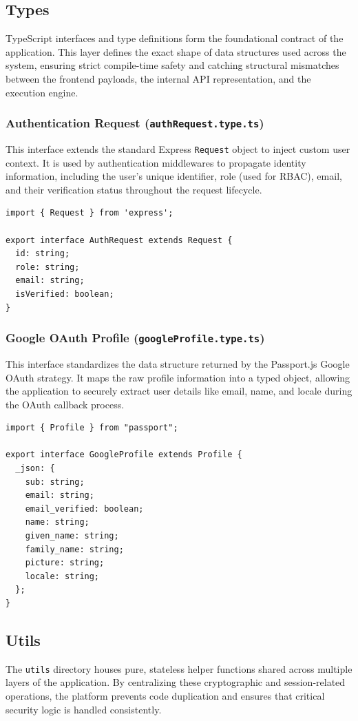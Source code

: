\subsection{Types}
TypeScript interfaces and type definitions form the foundational contract of the application. This layer defines the exact shape of data structures used across the system, ensuring strict compile-time safety and catching structural mismatches between the frontend payloads, the internal API representation, and the execution engine.

\subsubsection{Authentication Request (\texttt{authRequest.type.ts})}
This interface extends the standard Express \texttt{Request} object to inject custom user context. It is used by authentication middlewares to propagate identity information, including the user's unique identifier, role (used for RBAC), email, and their verification status throughout the request lifecycle.

\begin{lstlisting}[caption={Authentication Request Interface}]
import { Request } from 'express';

export interface AuthRequest extends Request {
  id: string;
  role: string;
  email: string;
  isVerified: boolean;
}
\end{lstlisting}

\subsubsection{Google OAuth Profile (\texttt{googleProfile.type.ts})}
This interface standardizes the data structure returned by the Passport.js Google OAuth strategy. It maps the raw profile information into a typed object, allowing the application to securely extract user details like email, name, and locale during the OAuth callback process.

\begin{lstlisting}[caption={Google OAuth Profile Interface}]
import { Profile } from "passport";

export interface GoogleProfile extends Profile {
  _json: {
    sub: string;
    email: string;
    email_verified: boolean;
    name: string;
    given_name: string;
    family_name: string;
    picture: string;
    locale: string;
  };
}
\end{lstlisting}

\subsection{Utils}
The \texttt{utils} directory houses pure, stateless helper functions shared across multiple layers of the application. By centralizing these cryptographic and session-related operations, the platform prevents code duplication and ensures that critical security logic is handled consistently.

